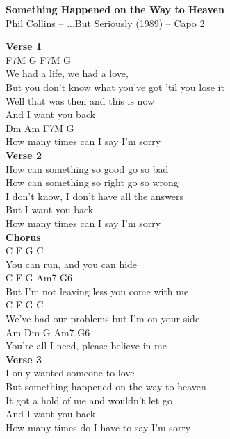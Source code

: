 \documentclass[a4paper]{article}
\begin{document}
    \begin{center}
        \textbf{Something Happened on the Way to Heaven}
        ~\\
        Phil Collins -- ...But Seriously (1989)
         -- Capo 2
    \end{center}
    {
        \scriptsize
        \textbf{Verse 1}
        ~\\
        {
            \cutive
            \obeyspaces
F7M   G      F7M   G
\\
We had a life, we had a love,
\\
But you don't know what you've got 'til you lose it
\\
Well that was then and this is now
\\
And I want you back
\\
Dm       Am                 F7M  G
\\
How many times can I say I'm sorry
\\

        }
        \textbf{Verse 2}
        ~\\
        {
            \cutive
            \obeyspaces
How can something so good go so bad
\\
How can something so right go so wrong
\\
I don't know, I don't have all the answers
\\
But I want you back
\\
How many times can I say I'm sorry
\\

        }
        \textbf{Chorus}
        ~\\
        {
            \cutive
            \obeyspaces
C      F       G      C
\\
You can run, and you can hide
\\
    C      F          G       Am7   G6
\\
But I'm not leaving less you come with me
\\
C        F                   G      C
\\
We've had our problems but I'm on your side
\\
Am           Dm    G        Am7  G6
\\
You're all I need, please believe in me
\\

        }
        \textbf{Verse 3}
        ~\\
        {
            \cutive
            \obeyspaces
I only wanted someone to love
\\
But something happened on the way to heaven
\\
It got a hold of me and wouldn't let go
\\
And I want you back
\\
How many times do I have to say I'm sorry
\\

}}
\end{document}
